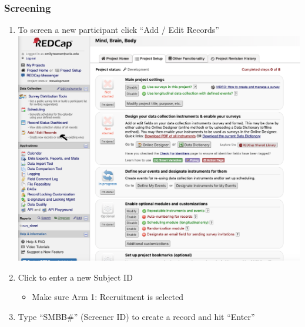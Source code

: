 \documentclass[]{book}
\providecommand{\tightlist}{%
  \setlength{\itemsep}{0pt}\setlength{\parskip}{0pt}}
\begin{document}
\hypertarget{screening}{%
\subsubsection{Screening}\label{screening}}

\begin{enumerate}
\def\labelenumi{\arabic{enumi}.}
\tightlist
\item
  To screen a new participant click ``Add / Edit Records''
  \includegraphics{images/redcap_screening/1.png}
\item
  Click to enter a new Subject ID

  \begin{itemize}
  \tightlist
  \item
    Make sure Arm 1: Recruitment is selected
  \end{itemize}
\item
  Type ``SMBB\#'' (Screener ID) to create a record and hit ``Enter''


\end{enumerate}
\end{document}

